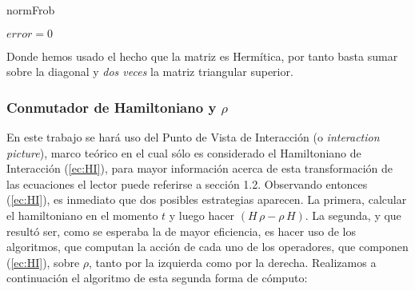 \begin{algorithm}[H]
\caption{normFrob}\label{algo:norma_frob}
\LinesNumbered
\KwIn{$\rho$}
$error=0$\;
\end{algorithm}
\quad Donde hemos usado el hecho que la matriz es Herm\'itica, por tanto basta sumar sobre la diagonal y \emph{dos veces} la matriz triangular superior.
\subsubsection{Conmutador de Hamiltoniano y $\rho$}
\quad En este trabajo se har\'a uso del Punto de Vista de Interacci\'on (o \emph{interaction picture}), marco te\'orico en el cual s\'olo es considerado el Hamiltoniano de Interacci\'on (\ref{ec:HI}), para mayor informaci\'on acerca de esta transformaci\'on de las ecuaciones el lector puede referirse a \cite{carmichael} secci\'on 1.2. Observando entonces (\ref{ec:HI}), es inmediato que dos posibles estrategias aparecen. La primera, calcular el hamiltoniano en el momento $t$ y luego hacer $(H\,\rho-\rho\,H)$. La segunda, y que result\'o ser, como se esperaba la de mayor eficiencia, es hacer uso de los algoritmos, que computan la acci\'on de cada uno de los operadores, que componen (\ref{ec:HI}), sobre $\rho$, tanto por la izquierda como por la derecha. Realizamos a continuaci\'on el algoritmo de esta segunda forma de c\'omputo:

